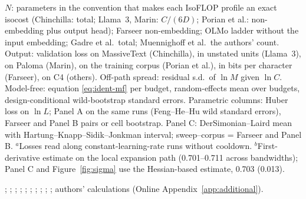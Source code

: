 \begin{table}[tp]
\begin{tablenotes}
$N$: parameters in the convention that makes each IsoFLOP profile an exact isocost (Chinchilla: total; Llama~3,
Marin: $C/(6D)$; Porian et al.: non-embedding plus output head); Farseer non-embedding; OLMo ladder without the
input embedding; Gadre et al.\ total; Muennighoff et al.\ the authors' count. Output: validation loss on MassiveText
(Chinchilla), in unstated units (Llama~3), on Paloma (Marin), on the training corpus (Porian et al.), in bits per
character (Farseer), on C4 (others). Off-path spread: residual s.d.\ of $\ln M$ given $\ln C$. Model-free: equation
\eqref{eq:ident-mf} per budget, random-effects mean over budgets, design-conditional wild-bootstrap standard errors.
Parametric columns: Huber loss on $\ln L$; Panel A on the same runs (Feng--He--Hu wild standard errors), Farseer and
Panel B pairs or cell bootstrap. Panel C: DerSimonian--Laird mean with Hartung--Knapp--Sidik--Jonkman interval;
sweep--corpus = Farseer and Panel B.
$^{a}$Losses read along constant-learning-rate runs without cooldown.
$^{b}$First-derivative estimate on the local expansion path (0.701--0.711 across bandwidths); Panel C and
Figure~\ref{fig:sigma} use the Hessian-based estimate, 0.703 (0.013).
\end{tablenotes}

\begin{tablenotes}[Source]
\citet{hoffmann2022training}; \citet{besiroglu2024chinchilla}; \citet{grattafiori2024llama};
\citet{czech2026llama3isoflop}; \citet{marin2026ladders}; \citet{porian2024resolving}; \citet{li2025predictableb};
\citet{gadre2024language}; \citet{bhagia2024establishing}; \citet{muennighoff2023scaling}; authors' calculations
(Online Appendix~\ref{app:additional}).
\end{tablenotes}
\end{table}
